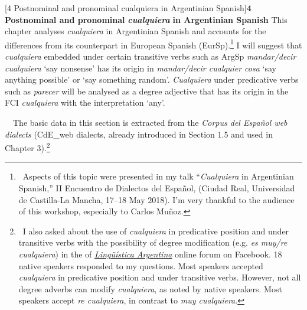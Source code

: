 \documentclass[10pt]{article}
\makeatletter
\newcommand\textstyleInternetlink[1]{#1}
\renewcommand\section{\@startsection{section}{1}{0.0cm}{0.5in}{0.3335in}{\normalfont\normalsize\fontsize{12pt}{14.4pt}\selectfont\bfseries\raggedright}}
\newenvironment{styleStandard}{\renewcommand\baselinestretch{1.25}\setlength\leftskip{0cm}\setlength\rightskip{0cm}\setlength\parindent{0cm}\setlength\parfillskip{0pt plus 1fil}\setlength\parskip{0in plus 1pt}\writerlistparindent\writerlistleftskip\leavevmode\normalfont\normalsize\fontsize{12pt}{14.4pt}\selectfont\writerlistlabel\ignorespaces}{\unskip\vspace{0in plus 1pt}\par}
\newcommand\writerlistleftskip{}
\newcommand\writerlistparindent{}
\newcommand\writerlistlabel{}
\makeatother
\begin{document}
\clearpage\section[4 Postnominal and pronominal cualquiera in Argentinian Spanish]{\textbf{4 Postnominal and pronominal }\textbf{\textit{cualquiera }}\textbf{in Argentinian Spanish}}
\begin{styleStandard}
This chapter analyses \textit{cualquiera} in Argentinian Spanish and accounts for the differences from its counterpart in European Spanish (EurSp).\footnote{\textrm{\ Aspects of this topic were presented in my talk “}\textrm{\textit{Cualquiera}}\textrm{ in Argentinian Spanish,” II Encuentro de Dialectos del Español, (Ciudad Real, Universidad de Castilla-La Mancha, 17–18 May 2018). I’m very thankful to the audience of this workshop, especially to Carlos Muñoz.}} I will suggest that \textit{cualquiera} embedded under certain transitive verbs such as ArgSp \textit{mandar/decir cualquiera} ‘say nonsense’ has its origin in \textit{mandar/decir cualquier cosa} ‘say anything possible’ or ‘say something random’. \textit{Cualquiera} under predicative verbs such as \textit{parecer} will be analysed as a degree adjective that has its origin in the FCI \textit{cualquiera} with the interpretation ‘any’.
\end{styleStandard}

\begin{styleStandard}
\ \ The basic data in this section is extracted from the \textit{Corpus del Español web dialects }(CdE\_web dialects, already introduced in Section 1.5 and used in Chapter 3).\footnote{\ \textrm{I also asked about the use of }\textrm{\textit{cualquiera}}\textrm{ in predicative position and under transitive verbs with the possibility of degree modification (e.g. }\textrm{\textit{es muy/re cualquiera}}\textrm{) in the of }\href{https://www.facebook.com/groups/686284488187168/permalink/992126550936292/}{\textstyleInternetlink{\textrm{\textit{Lingüística Argentina}}}}\textrm{ online forum on Facebook}.\textrm{ 18 native speakers responded to my questions. Most speakers accepted }\textrm{\textit{cualquiera}}\textrm{ in predicative position and under transitive verbs. However, not all degree adverbs can modify }\textrm{\textit{cualquiera}}\textrm{, as noted by native speakers. Most speakers accept }\textrm{\textit{re cualquiera}}\textrm{, in contrast to }\textrm{\textit{muy cualquiera}}\textrm{.}}
\end{styleStandard}
\end{document}
